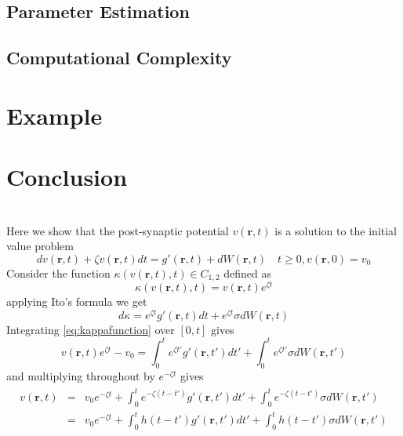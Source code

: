 \documentclass[a4paper,10pt]{article}
\begin{document}
\subsection{Parameter Estimation}
\subsection{Computational Complexity}
\section{Example}
\section{Conclusion}



\appendices
\section{}\label{app:InitialValueProblemProof}
Here we show that the post-synaptic potential $v(\mathbf r, t)$ is a solution to the initial value problem 
\begin{equation}
 dv(\mathbf r, t) + \zeta v(\mathbf r, t)dt = g'(\mathbf r, t) + dW(\mathbf r, t) \quad t\ge0, v(\mathbf r, 0) = v_0
\end{equation}
Consider the function $\kappa(v(\mathbf r, t), t) \in C_{1,2}$ defined as
\begin{equation}
\kappa(v(\mathbf r, t), t) = v(\mathbf r, t)e^{\zeta t}
\end{equation}
 applying Ito's formula we get
\begin{equation}\label{eq:kappafunction}
 d\kappa = e^{\zeta t}g'(\mathbf r, t)dt + e^{\zeta t}\sigma dW(\mathbf r, t)
\end{equation}
Integrating \eqref{eq:kappafunction} over $[0, t]$ gives 
\begin{equation}\label{eq:kappafunctionInteration}
 v(\mathbf r, t)e^{\zeta t}-v_0 = \int_0^te^{\zeta t'}g'(\mathbf r, t')dt' +\int_0^te^{\zeta t'}\sigma dW(\mathbf r, t')
\end{equation}
and multiplying throughout by $e^{-\zeta t}$ gives 
\begin{eqnarray}
\begin{split}
 v(\mathbf r, t) &=&v_0e^{-\zeta t}+ \int_0^te^{-\zeta(t-t')}g'(\mathbf r, t')dt' +\int_0^te^{-\zeta (t-t')}\sigma dW(\mathbf r, t')\\
&=&v_0e^{-\zeta t}+ \int_0^t h(t-t')g'(\mathbf r, t')dt' +\int_0^th(t-t')\sigma dW(\mathbf r, t')
\end{split}
\end{eqnarray}


\end{document}
